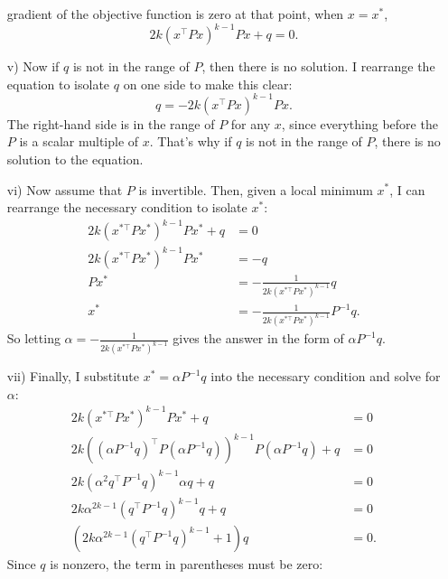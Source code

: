 \begin{homeworkProblem}
\begin{solution}
\begin{itemize}
                gradient of the objective function is zero at that point, when 
                $x = x^*$,
                \[
                    2 k (x^{\top} P x)^{k-1} P x + q = 0.
                \]  
            \item[v)] Now if $q$ is not in the range of $P$, then there is no solution. 
                I rearrange the equation to isolate $q$ on one side to make this clear:
                \[
                    q = -2 k (x^{\top} P x)^{k-1} P x.
                \]
                The right-hand side is in the range of $P$ for any $x$, since 
                everything before the $P$ is a scalar multiple of $x$. That's why if 
                $q$ is not in the range of $P$, there is no solution to the equation.
            \item[vi)] Now assume that $P$ is invertible. Then, given a local minimum $x^*$, 
                I can rearrange the necessary condition to isolate $x^*$:
                \begin{align*}
                    2 k (x^{*\top} P x^*)^{k-1} P x^* + q &= 0 \\
                    2 k (x^{*\top} P x^*)^{k-1} P x^* &= -q \\
                    P x^* &= -\frac{1}{2 k (x^{*\top} P x^*)^{k-1}} q \\
                    x^* &= -\frac{1}{2 k (x^{*\top} P x^*)^{k-1}} P^{-1} q.
                \end{align*}
                So letting $\alpha = -\frac{1}{2 k (x^{*\top} P x^*)^{k-1}}$ gives the 
                answer in the form of $\alpha P^{-1} q$.
            \item[vii)] Finally, I substitute $x^* = \alpha P^{-1} q$ into the necessary 
                condition and solve for $\alpha$:
                \begin{align*}
                    2 k (x^{*\top} P x^*)^{k-1} P x^* + q &= 0 \\
                    2 k ((\alpha P^{-1} q)^\top P (\alpha P^{-1} q))^{k-1} P (\alpha 
                    P^{-1} q) + q &= 0 \\
                    2 k (\alpha^2 q^\top P^{-1} q)^{k-1} \alpha q + q &= 0 \\
                    2 k \alpha^{2k - 1} (q^\top P^{-1} q)^{k-1} q + q &= 0 \\
                    (2 k \alpha^{2k - 1} (q^\top P^{-1} q)^{k-1} + 1) q &= 0.
                \end{align*}
                Since $q$ is nonzero, the term in parentheses must be zero:

\end{itemize}
\end{solution}
\end{homeworkProblem}
